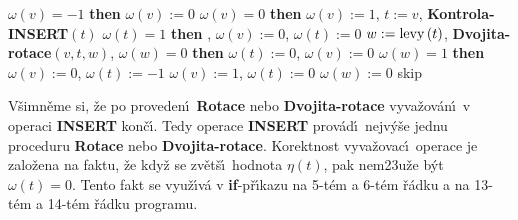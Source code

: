 \phantom{---}{\bf if} $\omega \left(v\right)=-1$ {\bf then}\newline 
\phantom{------}$\omega \left(v\right):=0$\newline 
\phantom{---}{\bf else}\newline 
\phantom{------}{\bf if} $\omega \left(v\right)=0$ {\bf then}\newline 
\phantom{---------}$\omega \left(v\right):=1$, $t:=v$, {\bf Kontrola-INSERT}$\left(t\right)$\newline 
\phantom{------}{\bf else}\newline 
\phantom{---------}{\bf if} $\omega \left(t\right)=1$ {\bf then}\newline 
\phantom{------------}{\bf Rotace$\left(v,t\right)$}, $\omega \left(v\right):=0$, $\omega \left(t\right):=0$\newline 
\phantom{---------}{\bf else}\newline 
\phantom{------------}$w:=\operatorname{levy}\left(t\right)$, {\bf Dvojita-rotace$\left(v,t,w\right)$},\newline 
\phantom{------------}{\bf if} $\omega \left(w\right)=0$ {\bf then}\newline 
\phantom{---------------}$\omega \left(t\right):=0$, $\omega \left(v\right):=0$\newline 
\phantom{------------}{\bf else}\newline 
\phantom{---------------}{\bf if} $\omega \left(w\right)=1$ {\bf then}\newline 
\phantom{------------------}$\omega \left(v\right):=0$, $\omega\left(t\right):=-1$\newline 
\phantom{---------------}{\bf else}\newline 
\phantom{------------------}$\omega \left(v\right):=1$, $\omega \left(t\right):=0$\newline 
\phantom{---------------}{\bf endif}\newline 
\phantom{------------}{\bf endif}\newline 
\phantom{------------}$\omega \left(w\right):=0$\newline 
\phantom{---------}{\bf endif}\newline 
\phantom{------}{\bf endif}\newline 
\phantom{---}{\bf endif\newline 
endif}
skip

\flushpar V\v simn\v eme si, \v ze po proveden\'\i\ {\bf Rotace} nebo
{\bf Dvojita-rotace} vyva\v zov\'an\'\i\ v operaci {\bf INSERT} kon\v c\'\i . Tedy 
operace {\bf INSERT} prov\'ad\'\i\ nejv\'y\v se jednu proceduru {\bf Rotace }
nebo {\bf Dvojita-rota\-ce}. Korektnost vyva\v zovac\'\i\ operace je 
zalo\v zena na faktu, \v ze kdy\v z se zv\v et\v s\'\i\ hodnota $
\eta \left(t\right)$, pak 
nem\accent23u\v ze b\'yt $\omega \left(t\right)=0$. Tento fakt se vyu\v z\'\i v\'a  v 
{\bf if}-p\v r\'\i kazu na 5-t\'em a 6-t\'em \v r\'adku a na 13-t\'em a 14-t\'em  
\v r\'adku programu.
\medskip

